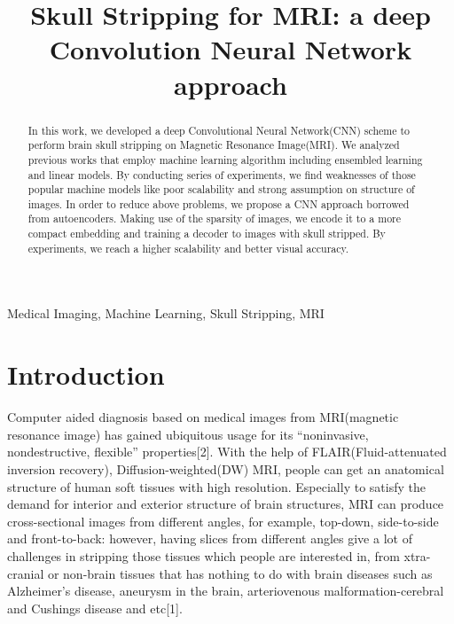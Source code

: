 \documentclass[conference]{IEEEtran}
\begin{document}
\title{Skull Stripping for MRI: a deep Convolution Neural Network approach}

\author{
\and
{}
}

\maketitle

\begin{abstract}
In this work, we developed a deep Convolutional Neural Network(CNN) scheme to perform brain skull stripping on Magnetic Resonance Image(MRI). We analyzed previous works that employ machine learning algorithm including ensembled learning and linear models. By conducting series of experiments, we find weaknesses of those popular machine models like poor scalability and strong assumption on structure of images. In order to reduce above problems, we propose a CNN approach borrowed from autoencoders. Making use of the sparsity of images, we encode it to a more compact embedding and training a decoder to images with skull stripped. By experiments, we reach a higher scalability and better visual accuracy. 

\end{abstract}

\begin{IEEEkeywords}
Medical Imaging, Machine Learning, Skull Stripping, MRI
\end{IEEEkeywords}

\section{Introduction}
Computer aided diagnosis based on medical images from MRI(magnetic resonance image) has gained ubiquitous usage for its “noninvasive, nondestructive, flexible” properties[2]. With the help of FLAIR(Fluid-attenuated inversion recovery), Diffusion-weighted(DW) MRI, people can get an anatomical structure of human soft tissues with high resolution. Especially to satisfy the demand for interior and exterior structure of brain structures, MRI can produce cross-sectional images from different angles, for example, top-down, side-to-side and front-to-back: however, having slices from different angles give a lot of challenges in stripping those tissues which people are interested in, from xtra-cranial or non-brain tissues that has nothing to do with brain diseases such as Alzheimer’s disease, aneurysm in the brain, arteriovenous malformation-cerebral and Cushings disease and etc[1]. 
\end{document}

